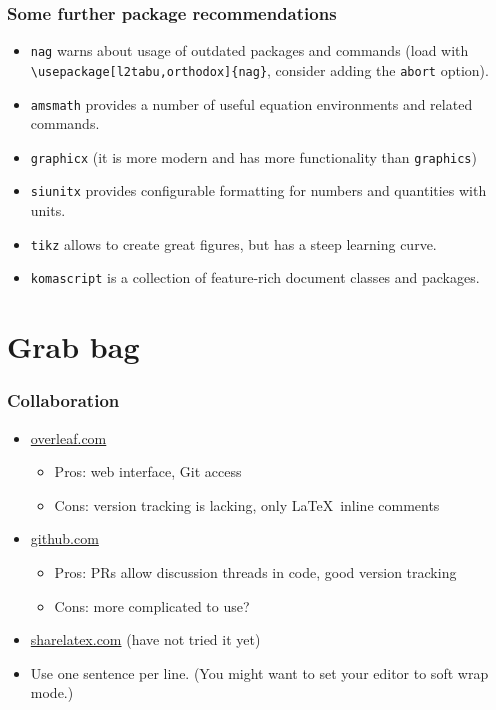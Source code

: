 \documentclass[aspectratio=1610,hyperref={colorlinks,linkcolor=}]{beamer}
\begin{document}
\begin{frame}[fragile]
    \frametitle{Some further package recommendations}
    \begin{itemize}
        \item \verb+nag+ warns about usage of outdated packages and commands (load with \verb$\usepackage[l2tabu,orthodox]{nag}$, consider adding the \verb+abort+ option).
        \item \verb+amsmath+ provides a number of useful equation environments and related commands.
        \item \verb+graphicx+ (it is more modern and has more functionality than \verb+graphics+)
        \item \verb+siunitx+ provides configurable formatting for numbers and quantities with units.
        \item \verb+tikz+ allows to create great figures, but has a steep learning curve.
        \item \verb+komascript+ is a collection of feature-rich document classes and packages.
    \end{itemize}
\end{frame}

\section{Grab bag}
\begin{frame}
    \frametitle{Collaboration}
    \begin{itemize}
        \item \url{overleaf.com}
            \begin{itemize}
                \item Pros: web interface, Git access
                \item Cons: version tracking is lacking, only \LaTeX\ inline comments
            \end{itemize}
        \item \url{github.com}
            \begin{itemize}
                \item Pros: PRs allow discussion threads in code, good version tracking
                \item Cons: more complicated to use?
            \end{itemize}
        \item \url{sharelatex.com} (have not tried it yet)
        \item Use one sentence per line. (You might want to set your editor to soft wrap mode.)
    \end{itemize}
\end{frame}
\end{document}
